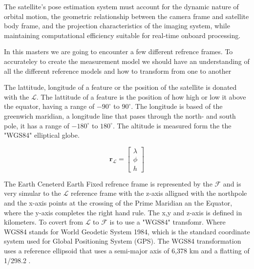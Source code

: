 The satellite's pose estimation system must account for the dynamic nature of orbital motion, 
the geometric relationship between the camera frame and satellite body frame, and the projection 
characteristics of the imaging system, while maintaining computational efficiency suitable for 
real-time onboard processing. 



In this masters we are going to encounter a few different refrence frames. To accurateley to create the measurement model we should have an understanding of all the different 
reference models and how to transform from one to another


The lattitude, longitude of a feature or the position of the satellite is donated with the $\mathcal{L}$. The lattitude of a feature is the position of how high or low it above the
equator, having a range of $-90^{\circ}$ to $90^{\circ}$. The longitude is based of the greenwich maridian, a longitude line that pases through the north- and south pole, it has a
range of $-180^{\circ}$ to $180^{\circ}$. The altitude is measured form the the "WGS84" elliptical globe.

\begin{equation}
    \mathbf{r}_\mathcal{L} = \begin{bmatrix}
    \lambda \\
    \phi \\
    h    
    \end{bmatrix} 
\end{equation}


The Earth Ceneterd Earth Fixed refrence frame is represented by the $\mathcal{F}$ and is very simular to the $\mathcal{L}$ reference frame with the z-axis alligned with the northpole
and the x-axis points at the crossing of the Prime Maridian an the Equator, where the y-axis completes the right hand rule. The x,y and z-axis is defined in kilometers.
To covert from $\mathcal{L}$ to $\mathcal{F}$ is to use a "WGS84" transfomr. Where WGS84 stands for World Geodetic System 1984, which is the standard coordinate system used for
Global Positioning System (GPS). The WGS84 transformation uses a reference ellipsoid that uses a semi-major axis of 6,378 km and a flatting of 1/298.2 .

